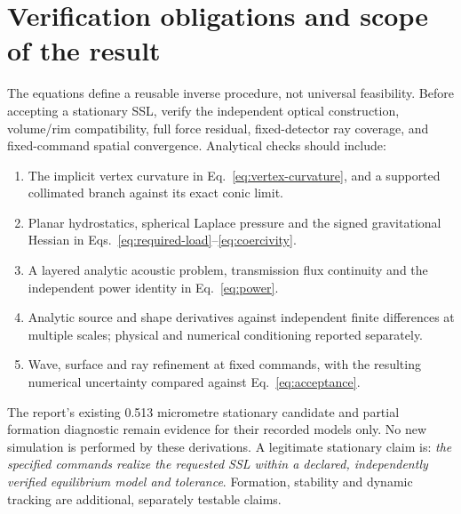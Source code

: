 \section{Verification obligations and scope of the result}
The equations define a reusable inverse procedure, not universal feasibility.
Before accepting a stationary SSL, verify the independent optical construction,
volume/rim compatibility, full force residual, fixed-detector ray coverage,
and fixed-command spatial convergence. Analytical checks should include:
\begin{enumerate}
 \item The implicit vertex curvature in Eq.~\eqref{eq:vertex-curvature},
 and a supported collimated branch against its exact conic limit.
 \item Planar hydrostatics, spherical Laplace pressure and the signed
 gravitational Hessian in Eqs.~\eqref{eq:required-load}--\eqref{eq:coercivity}.
 \item A layered analytic acoustic problem, transmission flux continuity
 and the independent power identity in Eq.~\eqref{eq:power}.
 \item Analytic source and shape derivatives against independent finite
 differences at multiple scales; physical and numerical conditioning reported separately.
 \item Wave, surface and ray refinement at fixed commands, with the
 resulting numerical uncertainty compared against Eq.~\eqref{eq:acceptance}.
\end{enumerate}
The report's existing 0.513 micrometre stationary candidate and partial
formation diagnostic remain evidence for their recorded models only.
No new simulation is performed by these derivations. A legitimate stationary
claim is: \emph{the specified commands realize the requested SSL within a
declared, independently verified equilibrium model and tolerance}. Formation,
stability and dynamic tracking are additional, separately testable claims.
